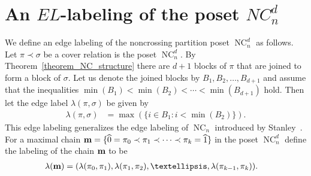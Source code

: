 \documentclass[11pt]{amsart}
\numberwithin{equation}{section}
\newcommand{\hz}{\widehat{0}}
\newcommand{\ho}{\widehat{1}}
\newcommand{\coveredby}{\prec}
\DeclareMathOperator{\NC}{NC}
\begin{document}
\section{An $EL$-labeling of the poset $NC^{d}_{n}$}
\label{section_EL-labeling_of_the_poset}

We define an edge labeling of the noncrossing partition poset $\NC^{d}_{n}$ as follows.
Let $\pi \coveredby \sigma$ be a cover relation is the poset $\NC^{d}_{n}$.
By Theorem~\ref{theorem_NC_structure}
there are $d+1$ blocks of $\pi$ that are joined to form a block of $\sigma$.
Let us denote the joined blocks by $B_{1}, B_{2},\ldots, B_{d+1}$
and assume that the inequalities $\min(B_{1}) < \min(B_{2}) < \cdots < \min(B_{d+1})$ hold.
Then let the edge label $\lambda(\pi,\sigma)$ be given by
\begin{align}
\lambda(\pi,\sigma)
& =
\max(\{i \in B_{1} : i < \min(B_{2})\}) .
\label{equation_the_edge_labeling}
\end{align}
This edge labeling generalizes the edge labeling of $\NC_{n}$ introduced
by Stanley~\cite{Stanley}. 
For a maximal chain
${\bf m} = \{\hz = \pi_{0} \coveredby \pi_{1} \coveredby \cdots  \coveredby \pi_{k} = \ho\}$
in the poset $\NC^{d}_{n}$
define the labeling of the chain ${\bf m}$ to be
\begin{align*}
\lambda({\bf m})
& =
(\lambda(\pi_{0},\pi_{1}),
\lambda(\pi_{1},\pi_{2}),
\ldots,
\lambda(\pi_{k-1},\pi_{k})) .
\end{align*}
\end{document}
